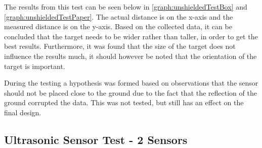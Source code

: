 
The results from this test can be seen below in
\autoref{graph:unshieldedTestBox} and \autoref{graph:unshieldedTestPaper}. The
actual distance is on the x-axis and the measured distance is on the y-axis.
Based on the collected data, it can be concluded that the target needs to be
wider rather than taller, in order to get the best results. Furthermore, it was
found that the size of the target does not influence the results much, it should
however be noted that the orientation of the target is important.





% 

During the testing a hypothesis was formed based on observations that the sensor
should not be placed close to the ground due to the fact that the reflection of
the ground corrupted the data. This was not tested, but still has an effect on the
final design. 

\subsection{Ultrasonic Sensor Test - 2 Sensors}

